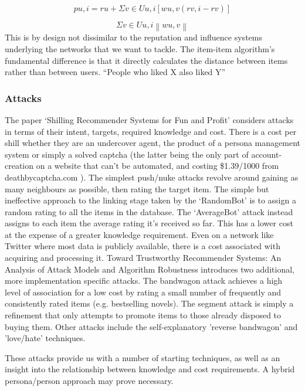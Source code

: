 \begin{equation*}
pu,i = ru + \Sigma v \in Uu,i [wu,v (rv,i − rv)]
\end{equation*}

\begin{equation*}
\Sigma v \in Uu,i \left\|wu,v \right\|
\end{equation*}
This is by design not dissimilar to the reputation and influence systems
underlying the networks that we want to tackle. The item-item algorithm's
fundamental difference is that it directly calculates the distance between items
rather than between users. ``People who liked X also liked Y''

\subsubsection{Attacks}

The paper `Shilling Recommender Systems for Fun and Profit' considers attacks in terms of their intent, targets, required knowledge and cost. There is a cost per shill whether they are an undercover agent, the product of a persona management system or simply a solved captcha (the latter being the only part of account-creation on a website that can't be automated, and costing \$1.39/1000 from deathbycaptcha.com ). The simplest push/nuke attacks revolve around gaining as many neighbours as possible, then rating the target item. The simple but ineffective approach to the linking stage taken by the `RandomBot' is to assign a random rating to all the items in the database. The `AverageBot' attack instead assigns to each item the average rating it's received so far. This has a lower cost at the expense of a greater knowledge requirement. Even on a network like Twitter where most data is publicly available, there is a cost associated with acquiring and processing it. Toward Trustworthy Recommender Systems: An Analysis of Attack Models and Algorithm Robustness introduces two additional, more implementation specific attacks. The bandwagon attack achieves a high level of association for a low cost by rating a small number of frequently and consistently rated items (e.g. bestselling novels).  The segment attack is simply a refinement that only attempts to promote items to those already disposed to buying them. Other attacks include the self-explanatory 'reverse bandwagon' and 'love/hate' techniques.

These attacks provide us with a number of starting techniques, as well as an insight into the relationship between knowledge and cost requirements. A hybrid persona/person approach may prove necessary.

